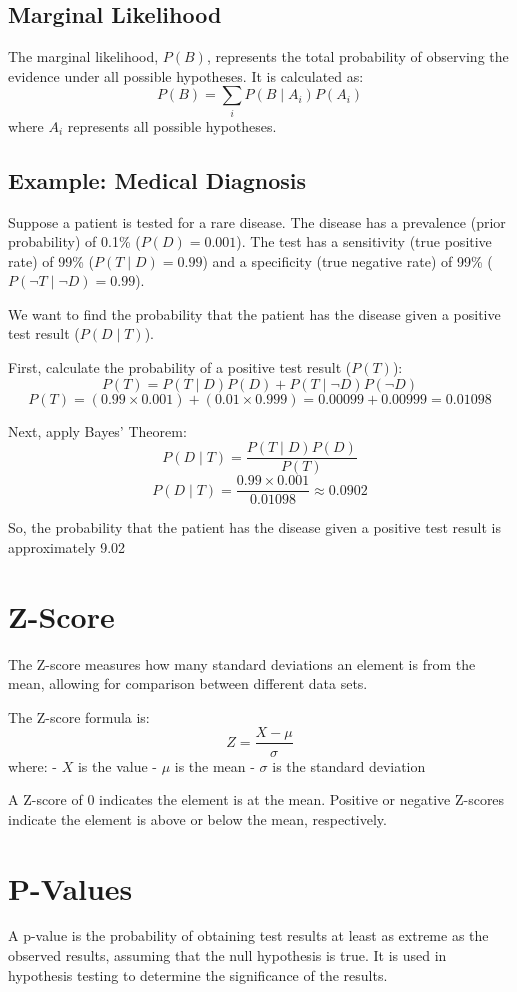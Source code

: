 \documentclass{article}
\begin{document}
\subsection{Marginal Likelihood}
The marginal likelihood, \(P(B)\), represents the total probability of observing the evidence under all possible hypotheses. It is calculated as:
\[
P(B) = \sum_{i} P(B \mid A_i) P(A_i)
\]
where \(A_i\) represents all possible hypotheses.

\subsection{Example: Medical Diagnosis}
Suppose a patient is tested for a rare disease. The disease has a prevalence (prior probability) of 0.1\% (\(P(D) = 0.001\)). The test has a sensitivity (true positive rate) of 99\% (\(P(T \mid D) = 0.99\)) and a specificity (true negative rate) of 99\% (\(P(\neg T \mid \neg D) = 0.99\)).

We want to find the probability that the patient has the disease given a positive test result (\(P(D \mid T)\)).

First, calculate the probability of a positive test result (\(P(T)\)):
\[
P(T) = P(T \mid D) P(D) + P(T \mid \neg D) P(\neg D)
\]
\[
P(T) = (0.99 \times 0.001) + (0.01 \times 0.999) = 0.00099 + 0.00999 = 0.01098
\]

Next, apply Bayes' Theorem:
\[
P(D \mid T) = \frac{P(T \mid D) P(D)}{P(T)}
\]
\[
P(D \mid T) = \frac{0.99 \times 0.001}{0.01098} \approx 0.0902
\]

So, the probability that the patient has the disease given a positive test result is approximately 9.02%

\section{Z-Score}
The Z-score measures how many standard deviations an element is from the mean, allowing for comparison between different data sets.

The Z-score formula is:
\[
Z = \frac{X - \mu}{\sigma}
\]
where:
- \(X\) is the value
- \(\mu\) is the mean
- \(\sigma\) is the standard deviation

A Z-score of 0 indicates the element is at the mean. Positive or negative Z-scores indicate the element is above or below the mean, respectively.

\section{P-Values}
A p-value is the probability of obtaining test results at least as extreme as the observed results, assuming that the null hypothesis is true. It is used in hypothesis testing to determine the significance of the results.
\end{document}

